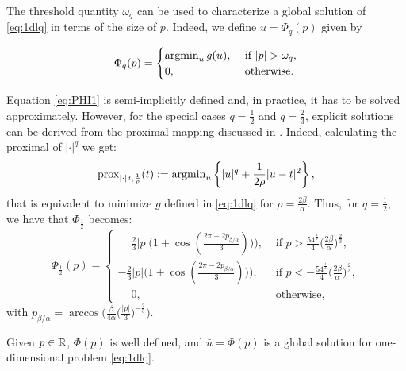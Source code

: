  The threshold quantity $\omega_q$ can be used to characterize a global solution of \eqref{eq:1dlq} in terms of the size of  $p$. Indeed, we define $\bar u = \Phi_q(p)$ given by
	
	\begin{equation}\label{eq:PHI1}
		\Phi_q (p) =	
		\begin{cases}
			\operatorname{argmin}_{u} g(u), & \text{ if } |p| > \omega_q, \\
			0,                          &	 \text{ otherwise.}
		\end{cases}
	\end{equation}
	\begin{remark}\label{rmrk:exact_threshold}
	Equation \eqref{eq:PHI1} is semi-implicitly defined and, in practice, it has to be solved approximately. However, for the special cases $q=\frac12$ and $q=\frac23$, explicit solutions can be derived from the proximal mapping discussed in \cite{CaoZungXu2013}. Indeed, calculating the proximal of $|\cdot|^q$ we get:
	$$\text{\textnormal{prox}}_{|\cdot|^q,\frac{1}{\rho}}(t):=\operatorname{argmin}_{u} \left\{|u|^q+\frac{1}{2\rho}|u-t|^2 \right \},$$
that is equivalent to minimize $g$ defined in \eqref{eq:1dlq} for $\rho=\frac{2\beta}{\alpha}$. Thus, for $q=\frac12$, we have that $\varPhi_{\frac12}$ becomes:
		\begin{equation}\label{eq:PHI1 q=1/2}
		\Phi_{\frac12} (p) =	
		\begin{cases}
			\phantom{-}\frac23 |p|\big(1+\cos(\frac{2\pi-2 p_{\beta/\alpha} }{3})) \big), & \text{ if } p > \frac{54^{\frac13}}{4}\big(\frac{2\beta}{\alpha}\big)^{\frac23}, \\
			-\frac23 |p|\big(1+\cos(\frac{2\pi-2p_{\beta/\alpha}}{3})) \big), & \text{ if } p< -\frac{54^{\frac13}}{4}\big(\frac{2\beta}{\alpha}\big)^{\frac23}, \\
			\phantom{-}0,                          &	\text{ otherwise},
		\end{cases}
	\end{equation}
	with $p_{\beta/\alpha}=\arccos \Big(\frac{\beta}{4\alpha}\big(\frac{|p|}{3}\big)^{-\frac23}\Big)$.
\end{remark}	

	\begin{theorem}\label{t:monotone_phi}
		Given $p \in \mathbb{R}$, $\Phi(p)$ is well defined, and $\bar u =\Phi(p)$ is a global solution for one-dimensional problem \eqref{eq:1dlq}.
	\end{theorem}
	

